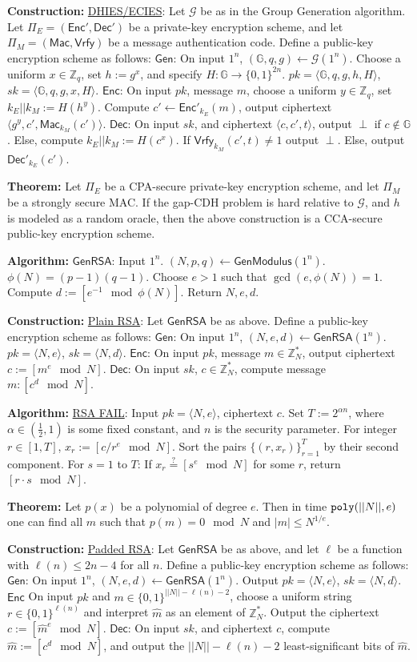 \documentclass[10pt]{article}
\newcommand{\Z}{\mathbb{Z}}
\newcommand{\G}{\mathbb{G}}
\newcommand{\GGG}{\mathcal{G}}
\newcommand{\thm}[1]{{\bf Theorem:} \underline{#1}}
\newcommand{\con}[1]{{\bf Construction:} \underline{#1}}
\newcommand{\alg}[1]{{\bf Algorithm:} \underline{#1}}
\newcommand{\Enc}{\mathsf{Enc}}
\newcommand{\Dec}{\mathsf{Dec}}
\newcommand{\Mac}{\mathsf{Mac}}
\newcommand{\Vrfy}{\mathsf{Vrfy}}
\newcommand{\Gen}{\mathsf{Gen}}
\newcommand{\GenM}{\mathsf{GenModulus}}
\newcommand{\GenRSA}{\mathsf{GenRSA}}
\newcommand{\ang}[1]{\langle#1\rangle}
\newcommand{\poly}{{\tt poly}}
\newcommand{\from}{\leftarrow}
\begin{document}
\begin{multicols}{3}
\con{DHIES/ECIES}: Let $\GGG$ be as in the Group Generation algorithm. Let $\Pi_E=(\Enc',\Dec')$ be a private-key encryption scheme, and let $\Pi_M=(\Mac,\Vrfy)$ be a message authentication code. Define a public-key encryption scheme as follows: $\Gen$: On input $1^n$, $(\G,q,g)\from\GGG(1^n)$. Choose a uniform $x\in\Z_q$, set $h:=g^x$, and specify $H:\G\to\{0,1\}^{2n}$. $pk=\ang{\G,q,g,h,H}$, $sk=\ang{\G,q,g,x,H}$. $\Enc$: On input $pk$, message $m$, choose a uniform $y\in\Z_q$, set $k_E||k_M:=H(h^y)$. Compute $c'\from\Enc'_{k_E}(m)$, output ciphertext $\ang{g^y,c',\Mac_{k_M}(c')}$. $\Dec$: On input $sk$, and ciphertext $\ang{c,c',t}$, output $\perp$ if $c\not\in\G$. Else, compute $k_E||k_M:=H(c^x)$. If $\Vrfy_{k_M}(c',t)\neq1$ output $\perp$. Else, output $\Dec'_{k_E}(c')$.

\thm{}Let $\Pi_E$ be a CPA-secure private-key encryption scheme, and let $\Pi_M$ be a strongly secure MAC. If the gap-CDH problem is hard relative to $\GGG$, and $h$ is modeled as a random oracle, then the above construction is a CCA-secure public-key encryption scheme.

\alg{$\GenRSA$}: Input $1^n$. $(N,p,q)\from\GenM(1^n)$. $\phi(N)=(p-1)(q-1)$. Choose $e>1$ such that $\gcd(e,\phi(N))=1$. Compute $d:=[e^{-1}\mod{\phi(N)}]$. Return $N,e,d$.

\con{Plain RSA}: Let $\GenRSA$ be as above. Define a public-key encryption scheme as follows: $\Gen$: On input $1^n$, $(N,e,d)\from\GenRSA(1^n)$. $pk=\ang{N,e}$, $sk=\ang{N,d}$. $\Enc$: On input $pk$, message $m\in\Z_N^*$, output ciphertext $c:=[m^e\mod{N}]$. $\Dec$: On input $sk$, $c\in\Z_N^*$, compute message $m:[c^d\mod{N}]$.

\alg{RSA FAIL}: Input $pk=\ang{N,e}$, ciphertext $c$. Set $T:=2^{\alpha n}$, where $\alpha\in(\frac{1}{2},1)$ is some fixed constant, and $n$ is the security parameter. For integer $r\in[1,T]$, $x_r:=[c/r^e\mod{N}]$. Sort the pairs $\{(r,x_r)\}^T_{r=1}$ by their second component. For $s=1$ to $T$: If $x_r\overset{?}{=}[s^e\mod{N}]$ for some $r$, return $[r\cdot s\mod{N}]$.

\thm{}Let $p(x)$ be a polynomial of degree $e$. Then in time $\poly(||N||,e)$ one can find all $m$ such that $p(m)=0\mod{N}$ and $|m|\leq N^{1/e}$.

\con{Padded RSA}: Let $\GenRSA$ be as above, and let $\ell$ be a function with $\ell(n)\leq2n-4$ for all $n$. Define a public-key encryption scheme as follows: $\Gen$: On input $1^n$, $(N,e,d)\from\GenRSA(1^n)$. Output $pk=\ang{N,e}$, $sk=\ang{N,d}$. $\Enc$ On input $pk$ and $m\in\{0,1\}^{||N||-\ell(n)-2}$, choose a uniform string $r\in\{0,1\}^{\ell(n)}$ and interpret $\hat{m}$ as an element of $\Z_N^*$. Output the ciphertext $c:=[\hat{m}^e\mod{N}]$. $\Dec$: On input $sk$, and ciphertext $c$, compute $\hat{m}:=[c^d\mod{N}]$, and output the $||N||-\ell(n)-2$ least-significant bits of $\hat{m}$.


\end{multicols}
\end{document}
